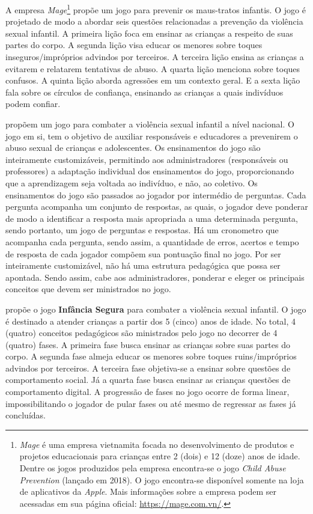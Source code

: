 A empresa \textit{Mage}\footnote{\textit{Mage} é uma empresa vietnamita focada no desenvolvimento de produtos e projetos educacionais para crianças entre 2 (dois) e 12 (doze) anos de idade. Dentre os jogos produzidos pela empresa encontra-se o jogo \textit{Child Abuse Prevention} (lançado em 2018). O jogo encontra-se disponível somente na loja de aplicativos da \textit{Apple}. Mais informações sobre a empresa podem ser acessadas em sua página oficial: \url{https://mage.com.vn/}.} propõe um jogo para prevenir os maus-tratos infantis. O jogo é projetado de modo a abordar seis questões relacionadas a prevenção da violência sexual infantil. A primeira lição foca em ensinar as crianças a respeito de suas partes do corpo. A segunda lição visa educar os menores sobre toques inseguros/impróprios advindos por terceiros. A terceira lição ensina as crianças a evitarem e relatarem tentativas de abuso. A quarta lição menciona sobre toques confusos. A quinta lição aborda agressões em um contexto geral. E a sexta lição fala sobre os círculos de confiança, ensinando as crianças a quais indivíduos podem confiar.

 propõem um jogo para combater a violência sexual infantil a nível nacional. O jogo em si, tem o objetivo de auxiliar responsáveis e educadores a prevenirem o abuso sexual de crianças e adolescentes. Os ensinamentos do jogo são inteiramente customizáveis, permitindo aos administradores (responsáveis ou professores) a adaptação individual dos ensinamentos do jogo, proporcionando que a aprendizagem seja voltada ao indivíduo, e não, ao coletivo. Os ensinamentos do jogo são passados ao jogador por intermédio de perguntas. Cada pergunta acompanha um conjunto de respostas, as quais, o jogador deve ponderar de modo a identificar a resposta mais apropriada a uma determinada pergunta, sendo portanto, um jogo de perguntas e respostas. Há um cronometro que acompanha cada pergunta, sendo assim, a quantidade de erros, acertos e tempo de resposta de cada jogador compõem sua pontuação final no jogo. Por ser inteiramente customizável, não há uma estrutura pedagógica que possa ser apontada. Sendo assim, cabe aos administradores, ponderar e eleger os principais conceitos que devem ser ministrados no jogo.

 propõe o jogo \textbf{Infância Segura} para combater a violência sexual infantil. O jogo é destinado a atender crianças a partir dos 5 (cinco) anos de idade. No total, 4 (quatro) conceitos pedagógicos são ministrados pelo jogo no decorrer de 4 (quatro) fases. A primeira fase busca ensinar as crianças sobre suas partes do corpo. A segunda fase almeja educar os menores sobre toques ruins/impróprios advindos por terceiros. A terceira fase objetiva-se a ensinar sobre questões de comportamento social. Já a quarta fase busca ensinar as crianças questões de comportamento digital. A progressão de fases no jogo ocorre de forma linear, impossibilitando o jogador de pular fases ou até mesmo de regressar as fases já concluídas. 

